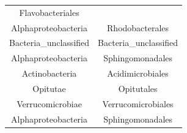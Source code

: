 \documentclass[]{article}
\begin{document}
\begin{longtable}[]{@{}cc@{}}
\begin{minipage}[t]{0.38\columnwidth}
Flavobacteriales\strut
\end{minipage}\tabularnewline
\begin{minipage}[t]{0.38\columnwidth}\centering\strut
Alphaproteobacteria\strut
\end{minipage} & \begin{minipage}[t]{0.38\columnwidth}\centering\strut
Rhodobacterales\strut
\end{minipage}\tabularnewline
\begin{minipage}[t]{0.38\columnwidth}\centering\strut
Bacteria\_unclassified\strut
\end{minipage} & \begin{minipage}[t]{0.38\columnwidth}\centering\strut
Bacteria\_unclassified\strut
\end{minipage}\tabularnewline
\begin{minipage}[t]{0.38\columnwidth}\centering\strut
Alphaproteobacteria\strut
\end{minipage} & \begin{minipage}[t]{0.38\columnwidth}\centering\strut
Sphingomonadales\strut
\end{minipage}\tabularnewline
\begin{minipage}[t]{0.38\columnwidth}\centering\strut
Actinobacteria\strut
\end{minipage} & \begin{minipage}[t]{0.38\columnwidth}\centering\strut
Acidimicrobiales\strut
\end{minipage}\tabularnewline
\begin{minipage}[t]{0.38\columnwidth}\centering\strut
Opitutae\strut
\end{minipage} & \begin{minipage}[t]{0.38\columnwidth}\centering\strut
Opitutales\strut
\end{minipage}\tabularnewline
\begin{minipage}[t]{0.38\columnwidth}\centering\strut
Verrucomicrobiae\strut
\end{minipage} & \begin{minipage}[t]{0.38\columnwidth}\centering\strut
Verrucomicrobiales\strut
\end{minipage}\tabularnewline
\begin{minipage}[t]{0.38\columnwidth}\centering\strut
Alphaproteobacteria\strut
\end{minipage} & \begin{minipage}[t]{0.38\columnwidth}\centering\strut
Sphingomonadales\strut
\end{minipage}\tabularnewline
\bottomrule
\end{longtable}
\end{document}
